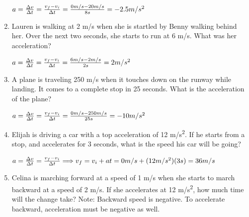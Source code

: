 \documentclass[letterpaper, 12pt]{article}
\begin{document}
\begin{enumerate}
		\vspace{0.15in}
		\color{red}
	\begin{center} $ a = \frac{\Delta v}{\Delta t } = \frac{v_f - v_i}{\Delta t} = \frac{0m/s-20m/s}{8s} = -2.5 m/s^2
		\vspace{0.95in} $
	\end{center}
	\color{black}



\item Lauren is walking at 2 m/s when she is startled by Benny walking behind her. Over the next two seconds, she starts to run at 6 m/s. What was her acceleration?
	
	\color{red}
	\begin{center} $ a = \frac{\Delta v}{\Delta t } = \frac{v_f - v_i}{\Delta t} = \frac{6m/s-2m/s}{2s} = 2 m/s^2
		\vspace{0.15in} $
	\end{center}
	\color{black}

\item A plane is traveling 250 m/s when it touches down on the runway while landing.  It comes to a complete stop in 25 seconds.  What is the acceleration of the plane?

		
	\color{red}
	\begin{center} $ a = \frac{\Delta v}{\Delta t } = \frac{v_f - v_i}{\Delta t} = \frac{0m/s-250m/s}{25s} = -10 m/s^2
		\vspace{0.15in} $
	\end{center}
	\color{black}
	
	


\item Elijah is driving a car with a top acceleration of 12 m/s\textsuperscript{2}.  If he starts from a stop, and accelerates for 3 seconds, what is the speed his car will be going?

		\vspace{0.15in}
		\color{red}
	\begin{center} $ a = \frac{\Delta v}{\Delta t } = \frac{v_f - v_i}{\Delta t} \Longrightarrow
		v_f = v_i + a t = 0 m/s + (12 m/s^2) (3s) = 36 m/s
		\vspace{0.15in} $
	\end{center}
	\color{black}
	

\item Celina is marching forward at a speed of 1 m/s when she starts to march backward at a speed of 2 m/s.  If she accelerates at 12 m/s\textsuperscript{2}, how much time will the change take? \color{red} Note: Backward speed is negative.  To accelerate backward, acceleration must be negative as well.


\end{enumerate}
\end{document}
